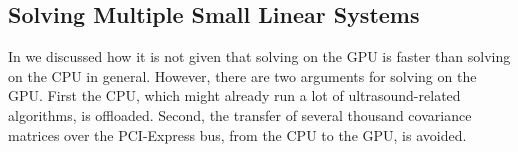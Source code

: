 \documentclass[journal]{IEEEtran}
\begin{document}

\subsection{Solving Multiple Small Linear Systems}

In \cite{asen2012} we discussed how it is not given that solving on the GPU is faster than solving on the CPU in general. However, there are two arguments for solving on the GPU. First the CPU, which might already run a lot of ultrasound-related algorithms, is offloaded. Second, the transfer of several thousand covariance matrices over the PCI-Express bus, from the CPU to the GPU, is avoided.
\end{document}
